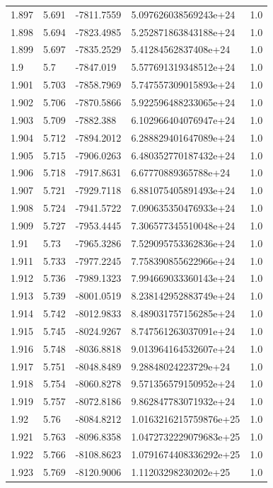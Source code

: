 \begin{tabular}{lllll}
1.897 & 5.691 & -7811.7559 & 5.097626038569243e+24 & 1.0 \\
1.898 & 5.694 & -7823.4985 & 5.252871863843188e+24 & 1.0 \\
1.899 & 5.697 & -7835.2529 & 5.41284562837408e+24 & 1.0 \\
1.9 & 5.7 & -7847.019 & 5.577691319348512e+24 & 1.0 \\
1.901 & 5.703 & -7858.7969 & 5.747557309015893e+24 & 1.0 \\
1.902 & 5.706 & -7870.5866 & 5.922596488233065e+24 & 1.0 \\
1.903 & 5.709 & -7882.388 & 6.102966404076947e+24 & 1.0 \\
1.904 & 5.712 & -7894.2012 & 6.288829401647089e+24 & 1.0 \\
1.905 & 5.715 & -7906.0263 & 6.480352770187432e+24 & 1.0 \\
1.906 & 5.718 & -7917.8631 & 6.67770889365788e+24 & 1.0 \\
1.907 & 5.721 & -7929.7118 & 6.881075405891493e+24 & 1.0 \\
1.908 & 5.724 & -7941.5722 & 7.090635350476933e+24 & 1.0 \\
1.909 & 5.727 & -7953.4445 & 7.306577345510048e+24 & 1.0 \\
1.91 & 5.73 & -7965.3286 & 7.529095753362836e+24 & 1.0 \\
1.911 & 5.733 & -7977.2245 & 7.758390855622966e+24 & 1.0 \\
1.912 & 5.736 & -7989.1323 & 7.994669033360143e+24 & 1.0 \\
1.913 & 5.739 & -8001.0519 & 8.238142952883749e+24 & 1.0 \\
1.914 & 5.742 & -8012.9833 & 8.489031757156285e+24 & 1.0 \\
1.915 & 5.745 & -8024.9267 & 8.747561263037091e+24 & 1.0 \\
1.916 & 5.748 & -8036.8818 & 9.013964164532607e+24 & 1.0 \\
1.917 & 5.751 & -8048.8489 & 9.28848024223729e+24 & 1.0 \\
1.918 & 5.754 & -8060.8278 & 9.571356579150952e+24 & 1.0 \\
1.919 & 5.757 & -8072.8186 & 9.862847783071932e+24 & 1.0 \\
1.92 & 5.76 & -8084.8212 & 1.0163216215759876e+25 & 1.0 \\
1.921 & 5.763 & -8096.8358 & 1.0472732229079683e+25 & 1.0 \\
1.922 & 5.766 & -8108.8623 & 1.0791674408336292e+25 & 1.0 \\
1.923 & 5.769 & -8120.9006 & 1.11203298230202e+25 & 1.0 \\

\end{tabular}
